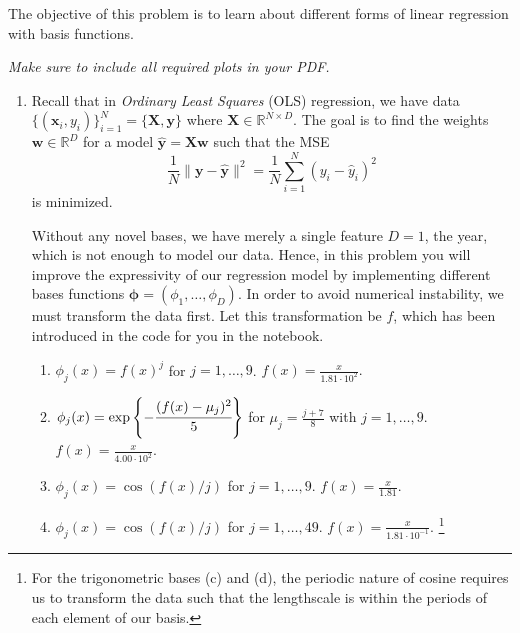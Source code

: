 \documentclass[submit]{harvardml}
\begin{document}

\newpage
\begin{problem}

 The objective of this problem is to learn about different forms of
 linear regression with basis functions.

\vspace{1em}
\noindent\emph{Make sure to include all required plots in your PDF.}

\begin{enumerate}
\item 
Recall that in \emph{Ordinary Least Squares} (OLS) regression,
we have data $\{(\mathbf{x}_i, y_i)\}_{i=1}^N = \{\mathbf{X}, \mathbf{y}\}$ 
where $\mathbf{X} \in \mathbb{R}^{N\times D}$. The goal is to find 
the weights $\mathbf{w} \in \mathbb{R}^{D}$ for a model 
$\hat{\mathbf{y}} = \mathbf{X}\mathbf{w}$ such that the MSE 
\[ \frac{1}{N} \| \mathbf{y} - \hat{\mathbf{y}}\|^2 = \frac{1}{N} \sum_{i = 1} ^N (y_i - \hat{y}_i)^2\] 
is minimized. 

Without any novel bases, we have merely a single feature $D=1$, 
the year, which is not enough to model our data. Hence, in this 
problem you will improve the expressivity of our regression 
model by implementing different bases functions 
$\mathbf{\phi} = (\phi_1,\ldots,\phi_D)$. In order to avoid numerical instability, 
we must transform the data first. Let
this transformation be $f$, which has been introduced in
the code for you in the notebook.
\begin{enumerate}
  \item $\phi_j(x)= f(x)^j$ for $j=1,\ldots, 9$. $f(x) = \frac{x}{1.81 \cdot 10^{2}}.$
  \item $\phi_j(x) = \exp\left\{-\cfrac{(f(x)-\mu_j)^2}{5}\right\}$ for $\mu_j=\frac{j + 7}{8}$ with $j=1,\ldots, 9$. $f(x) = \frac{x}{4.00 \cdot 10^{2}}.$
  \item $\phi_j(x) =  \cos(f(x) / j)$ for $j=1, \ldots, 9$. $f(x) = \frac{x}{1.81}$.
  \item $\phi_j(x) = \cos(f(x) / j)$ for $j=1, \ldots, 49$. $f(x) = \frac{x}{1.81 \cdot 10^{-1}}$. \footnote{For the trigonometric bases (c) and (d), the periodic nature of
cosine requires us to transform the data such that the 
lengthscale is within the periods of each element of our basis.}


\end{enumerate}
\end{enumerate}
\end{problem}
\end{document}

